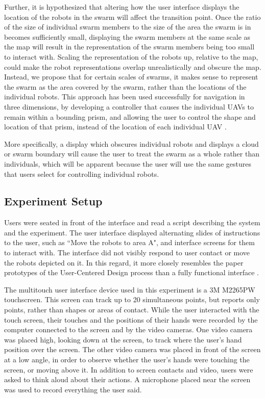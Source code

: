 Further, it is hypothesized that altering how the user interface displays the location of the robots in the swarm will affect the transition point.
Once the ratio of the size of individual swarm members to the size of the area the swarm is in becomes sufficiently small, displaying the swarm members at the same scale as the map will result in the representation of the swarm members being too small to interact with. 
Scaling the representation of the robots up, relative to the map, could make the robot representations overlap unrealistically and obscure the map. 
Instead, we propose that for certain scales of swarms, it makes sense to represent the swarm as the area covered by the swarm, rather than the locations of the individual robots.
This approach has been used successfully for navigation in three dimensions, by developing a controller that causes the individual UAVs to remain within a bounding prism, and allowing the user to control the shape and location of that prism, instead of the location of each individual UAV \citep{ayanian2014controlling}.
 
More specifically, a display which obscures individual robots and displays a cloud or swarm boundary will cause the user to treat the swarm as a whole rather than individuals, which will be apparent because the user will use the same gestures that users select for controlling individual robots. 

\subsection{Experiment Setup}



Users were seated in front of the interface and read a script describing the system and the experiment. The user interface displayed alternating slides of instructions to the user, such as ``Move the robots to area A", and interface screens for them to interact with. 
The interface did not visibly respond to user contact or move the robots depicted on it.
In this regard, it more closely resembles the paper prototypes of the User-Centered Design process than a fully functional interface \citep{ehn1992cardboard}.

The multitouch user interface device used in this experiment is a 3M M2265PW touchscreen. 
This screen can track up to 20 simultaneous points, but reports only points, rather than shapes or areas of contact. 
While the user interacted with the touch screen, their touches and the positions of their hands were recorded by the computer connected to the screen and by the video cameras. 
One video camera was placed high, looking down at the screen, to track where the user's hand position over the screen. 
The other video camera was placed in front of the screen at a low angle, in order to observe whether the user's hands were touching the screen, or moving above it. 
In addition to screen contacts and video, users were asked to think aloud about their actions.
A microphone placed near the screen was used to record everything the user said. 

